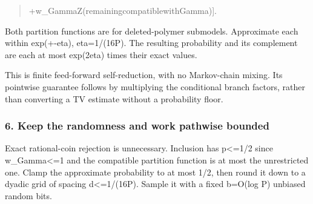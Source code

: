 \documentclass[
]{article}
\begin{document}
\begin{quote}
\noindent \hspace*{0.525em}\allowbreak{}\hspace*{0.525em}\allowbreak{}\hspace*{0.525em}\allowbreak{}\hspace*{0.525em}\allowbreak{}\hspace*{0.525em}\allowbreak{}\hspace*{0.525em}\allowbreak{}\hspace*{0.525em}\allowbreak{}+\allowbreak{}\hspace*{0.525em}\allowbreak{}w\allowbreak{}\_\allowbreak{}G\allowbreak{}a\allowbreak{}m\allowbreak{}m\allowbreak{}a\allowbreak{}\hspace*{0.525em}\allowbreak{}Z\allowbreak{}(\allowbreak{}r\allowbreak{}e\allowbreak{}m\allowbreak{}a\allowbreak{}i\allowbreak{}n\allowbreak{}i\allowbreak{}n\allowbreak{}g\allowbreak{}\hspace*{0.525em}\allowbreak{}c\allowbreak{}o\allowbreak{}m\allowbreak{}p\allowbreak{}a\allowbreak{}t\allowbreak{}i\allowbreak{}b\allowbreak{}l\allowbreak{}e\allowbreak{}\hspace*{0.525em}\allowbreak{}w\allowbreak{}i\allowbreak{}t\allowbreak{}h\allowbreak{}\hspace*{0.525em}\allowbreak{}G\allowbreak{}a\allowbreak{}m\allowbreak{}m\allowbreak{}a\allowbreak{})\allowbreak{}]\allowbreak{}.\par
\end{quote}

Both partition functions are for deleted-polymer submodels. Approximate
each within exp(+-eta), eta=1/(16P). The resulting probability and its
complement are each at most exp(2eta) times their exact values.

This is finite feed-forward self-reduction, with no Markov-chain mixing.
Its pointwise guarantee follows by multiplying the conditional branch
factors, rather than converting a TV estimate without a probability
floor.

\subsubsection{6. Keep the randomness and work pathwise
bounded}\label{keep-the-randomness-and-work-pathwise-bounded}

Exact rational-coin rejection is unnecessary. Inclusion has
p\textless=1/2 since w\_Gamma\textless=1 and the compatible partition
function is at most the unrestricted one. Clamp the approximate
probability to at most 1/2, then round it down to a dyadic grid of
spacing d\textless=1/(16P). Sample it with a fixed b=O(log P) unbiased
random bits.
\end{document}
